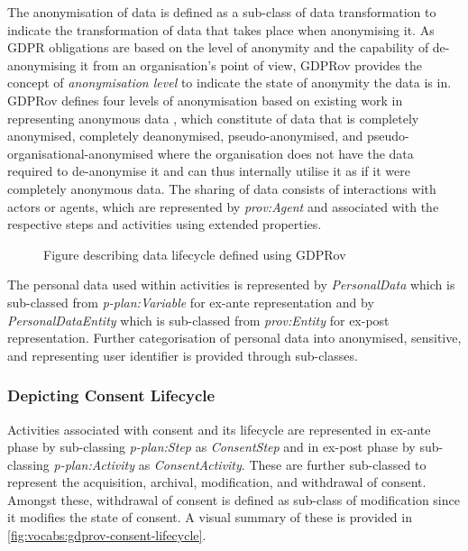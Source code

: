 The anonymisation of data is defined as a sub-class of data transformation to indicate the transformation of data that takes place when anonymising it.
As GDPR obligations are based on the level of anonymity and the capability of de-anonymising it from an organisation's point of view, GDPRov provides the concept of \textit{anonymisation level} to indicate the state of anonymity the data is in.
GDPRov defines four levels of anonymisation based on existing work in representing anonymous data \cite{}, which constitute of data that is completely anonymised, completely deanonymised, pseudo-anonymised, and pseudo-organisational-anonymised where the organisation does not have the data required to de-anonymise it and can thus internally utilise it as if it were completely anonymous data.
The sharing of data consists of interactions with actors or agents, which are represented by \textit{prov:Agent} and associated with the respective steps and activities using extended properties.
\begin{figure}[htbp]
    \centering
    \missingfigure[figcolor=white]{}
    \caption{Figure describing data lifecycle defined using GDPRov}
    \label{fig:vocabs:gdprov-data-lifecycle}
\end{figure}

The personal data used within activities is represented by \textit{PersonalData} which is sub-classed from \textit{p-plan:Variable} for ex-ante representation and by \textit{PersonalDataEntity} which is sub-classed from \textit{prov:Entity} for ex-post representation.
Further categorisation of personal data into anonymised, sensitive, and representing user identifier is provided through sub-classes.

\subsubsection{Depicting Consent Lifecycle}
Activities associated with consent and its lifecycle are represented in ex-ante phase by sub-classing \textit{p-plan:Step} as \textit{ConsentStep} and in ex-post phase by sub-classing \textit{p-plan:Activity} as \textit{ConsentActivity}.
These are further sub-classed to represent the acquisition, archival, modification, and withdrawal of consent.
Amongst these, withdrawal of consent is defined as sub-class of modification since it modifies the state of consent.
A visual summary of these is provided in \autoref{fig:vocabs:gdprov-consent-lifecycle}.

